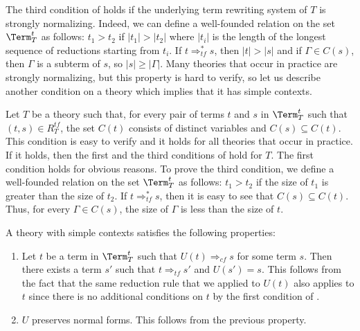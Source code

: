 The third condition of  holds if the underlying term rewriting system of $T$ is strongly normalizing.
Indeed, we can define a well-founded relation on the set $\Term_T^t$ as follows: $t_1 > t_2$ if $|t_1| > |t_2|$ where $|t_i|$ is the length of the longest sequence of reductions starting from $t_i$.
If $t \Rightarrow_{tf}^* s$, then $|t| > |s|$ and if $\Gamma \in C(s)$, then $\Gamma$ is a subterm of $s$, so $|s| \geq |\Gamma|$.
Many theories that occur in practice are strongly normalizing, but this property is hard to verify, so let us describe another condition on a theory which implies that it has simple contexts.

Let $T$ be a theory such that, for every pair of terms $t$ and $s$ in $\Term_T^t$ such that $(t,s) \in R^{tf}_T$, the set $C(t)$ consists of distinct variables and $C(s) \subseteq C(t)$.
This condition is easy to verify and it holds for all theories that occur in practice.
If it holds, then the first and the third conditions of  hold for $T$.
The first condition holds for obvious reasons.
To prove the third condition, we define a well-founded relation on the set $\Term_T^t$ as follows: $t_1 > t_2$ if the size of $t_1$ is greater than the size of $t_2$.
If $t \Rightarrow_{tf}^* s$, then it is easy to see that $C(s) \subseteq C(t)$.
Thus, for every $\Gamma \in C(s)$, the size of $\Gamma$ is less than the size of $t$.

A theory with simple contexts satisfies the following properties:
\begin{enumerate}
\item \label{it:red-fib} Let $t$ be a term in $\Term_T^t$ such that $U(t) \Rightarrow_{cf} s$ for some term $s$.
Then there exists a term $s'$ such that $t \Rightarrow_{tf} s'$ and $U(s') = s$.
This follows from the fact that the same reduction rule that we applied to $U(t)$ also applies to $t$ since there is no additional conditions on $t$ by the first condition of .
\item \label{it:red-nf} $U$ preserves normal forms. This follows from the previous property.
\end{enumerate}

